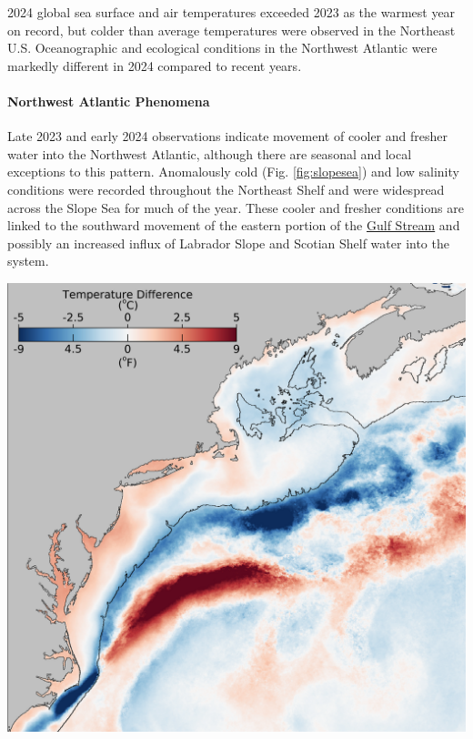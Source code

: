 \documentclass[
  10pt,
]{article}
\let\origfigure\figure
\let\endorigfigure\endfigure
\renewenvironment{figure}[1][2] {
    \expandafter\origfigure\expandafter[H]
} {
    \endorigfigure
}
\begin{document}
2024 global sea surface and air temperatures exceeded 2023 as the warmest year on record, but colder than average temperatures were observed in the Northeast U.S. Oceanographic and ecological conditions in the Northwest Atlantic were markedly different in 2024 compared to recent years.

\paragraph{Northwest Atlantic Phenomena}\label{northwest-atlantic-phenomena}

Late 2023 and early 2024 observations indicate movement of cooler and fresher water into the Northwest Atlantic, although there are seasonal and local exceptions to this pattern. Anomalously cold (Fig. \ref{fig:slopesea}) and low salinity conditions were recorded throughout the Northeast Shelf and were widespread across the Slope Sea for much of the year. These cooler and fresher conditions are linked to the southward movement of the eastern portion of the \href{https://noaa-edab.github.io/catalog/gsi.html}{Gulf Stream} and possibly an increased influx of Labrador Slope and Scotian Shelf water into the system.

\begin{figure}

{\centering \includegraphics[width=0.65\linewidth]{midatlantic_files/figure-latex/slopesea-1} 

}

\caption{February 2024 sea surface temperature difference compared to the February 2000-2020 long-term mean from the NOAA Advanced Clear-Sky Processor for Ocean (ACSPO) Super-collated SST.}\label{fig:slopesea}
\end{figure}
\end{document}
